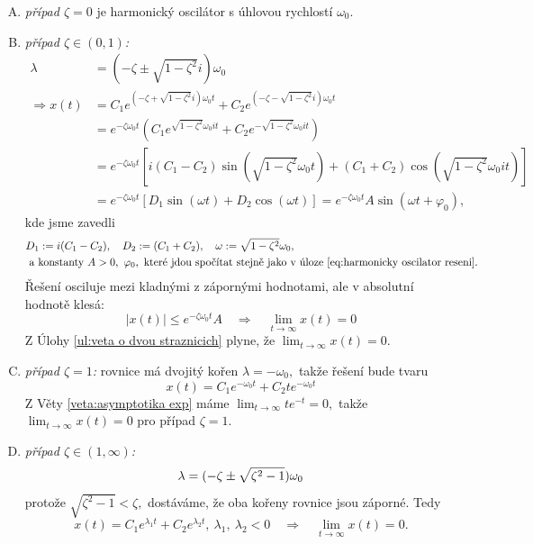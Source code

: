 \begin{enumerate}[(A)]
\item \textit{případ $\zeta=0$} je harmonický oscilátor s úhlovou rychlostí $\omega_0.$

\item \textit{případ $\zeta\in (0,1)$:} 
\begin{align*}
	\lambda &= (-\zeta \pm \sqrt{1-\zeta^{2}}i)\omega_0 \\
	\!\!\!\Rightarrow x(t)&=C_1e^{\left(-\zeta+\sqrt{1-\zeta^{2}}i\right)\omega_0 t}+C_2e^{\left(-\zeta-\sqrt{1-\zeta^{2}}i\right)\omega_0 t} \\
			&= e^{-\zeta \omega_0 t}(C_1e^{\sqrt{1-\zeta^{2}}\omega_0 it}+C_2e^{-\sqrt{1-\zeta^{2}}\omega_0 it}) \\
			&=e^{-\zeta \omega_0 t}\left[i(C_1-C_2)\sin(\sqrt{1-\zeta^{2}}\omega_0 t)+(C_1+C_2)\cos(\sqrt{1-\zeta^{2}}\omega_0 it)\right] \\
			&=e^{-\zeta \omega_0 t}\left[D_1\sin(\omega t)+D_2\cos(\omega t)\right] = e^{-\zeta \omega_0 t}A\sin(\omega t+\varphi_0),
\end{align*}
kde jsme zavedli
\begin{align*}
  &D_1 := i(C_1-C_2),\quad D_2:=(C_1+C_2),\quad \omega := \sqrt{1-\zeta^{2}}\omega_0, \\
  &\text{ a konstanty } A>0,\ \varphi_0, \text{ které jdou spočítat stejně jako v úloze \ref{eq:harmonicky oscilator reseni}.}
\end{align*}
Řešení osciluje mezi kladnými z zápornými hodnotami, ale v absolutní hodnotě klesá:
\begin{equation*}
	|x(t)| \leq e^{-\zeta \omega_0 t}A\quad \Rightarrow \quad \lim_{t\to \infty}x(t)=0
\end{equation*}
Z Úlohy \ref{ul:veta o dvou straznicich} plyne, že $\lim_{t\to \infty}x(t)=0.$

\item \textit{případ $\zeta=1$:} rovnice má dvojitý kořen $\lambda=-\omega_0,$ takže řešení bude tvaru
\begin{equation*}
  x(t)=C_1e^{-\omega_0 t}+C_2te^{-\omega_0 t}
\end{equation*}
Z Věty \ref{veta:asymptotika exp} máme $\lim_{t\to \infty}te^{-t}=0,$ takže $\lim_{t\to \infty}x(t)=0$ pro případ $\zeta=1$.

\item \textit{případ $\zeta\in (1,\infty)$:}
\begin{equation*}
	\lambda = (-\zeta \pm \sqrt{\zeta^{2}-1})\omega_0 \\
\end{equation*}
protože $\sqrt{\zeta^{2}-1}<\zeta,$ dostáváme, že oba kořeny rovnice jsou záporné. Tedy
\begin{equation*}
	x(t)=C_1e^{\lambda_1 t}+C_2e^{\lambda_2 t},\ \lambda_1,\ \lambda_2<0\quad \Rightarrow \quad\lim_{t\to \infty}x(t)=0.
\end{equation*}


\end{enumerate}
